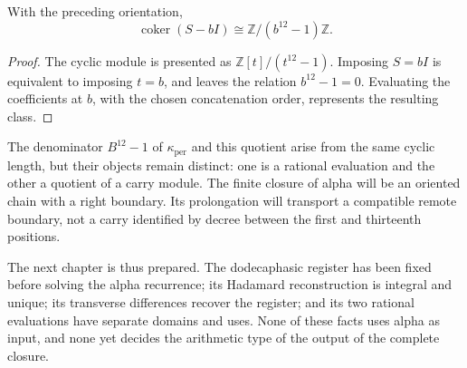 \begin{proposition}
\label{x_reciprocidad:prop:k-cociente-acarreo}
With the preceding orientation,
\[
 \operatorname{coker}(S-bI)\cong\mathbb Z/(b^{12}-1)\mathbb Z.
\]
\end{proposition}

\begin{proof}
The cyclic module is presented as
\(\mathbb Z[t]/(t^{12}-1)\). Imposing \(S=bI\) is equivalent to imposing
\(t=b\), and leaves the relation \(b^{12}-1=0\). Evaluating the
coefficients at \(b\), with the chosen concatenation order, represents
the resulting class.
\end{proof}

The denominator \(B^{12}-1\) of \(\kappa_{\mathrm{per}}\) and this
quotient arise from the same cyclic length, but their objects remain
distinct: one is a rational evaluation and the other a quotient
of a carry module. The finite closure of alpha will be an oriented
chain with a right boundary. Its prolongation will transport a
compatible remote boundary, not a carry identified by decree
between the first and thirteenth positions.

The next chapter is thus prepared. The dodecaphasic register has been fixed before
solving the alpha recurrence; its Hadamard reconstruction is
integral and unique; its transverse differences recover the register; and
its two rational evaluations have separate domains and uses. None
of these facts uses alpha as input, and none yet decides the
arithmetic type of the output of the complete closure.
